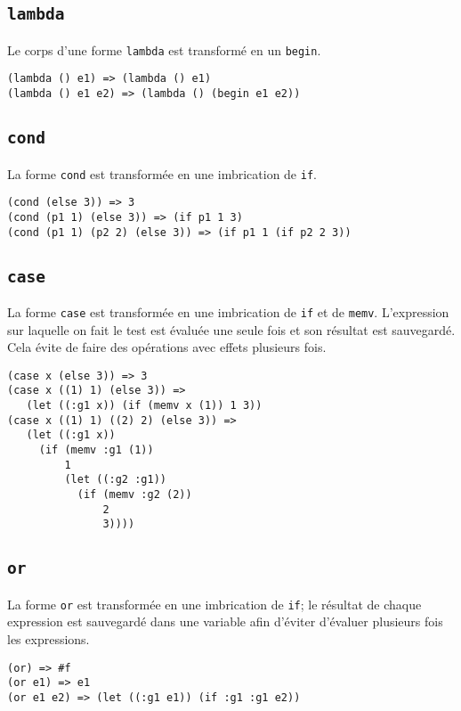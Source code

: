 \documentclass[11pt]{report}
\begin{document}
\subsection{\tt lambda}

Le corps d'une forme {\tt lambda} est transformé en un {\tt begin}.

\begin{verbatim}
(lambda () e1) => (lambda () e1)
(lambda () e1 e2) => (lambda () (begin e1 e2))
\end{verbatim}


\subsection{\tt cond}

La forme {\tt cond} est transformée en une imbrication de {\tt if}.


\begin{verbatim}
(cond (else 3)) => 3
(cond (p1 1) (else 3)) => (if p1 1 3)
(cond (p1 1) (p2 2) (else 3)) => (if p1 1 (if p2 2 3))
\end{verbatim}


\subsection{\tt case}

La forme {\tt case} est transformée en une imbrication de {\tt if} et
de {\tt memv}. L'expression sur laquelle on fait le test est évaluée
une seule fois et son résultat est sauvegardé.  Cela évite de faire
des opérations avec effets plusieurs fois.


\begin{verbatim}
(case x (else 3)) => 3
(case x ((1) 1) (else 3)) =>
   (let ((:g1 x)) (if (memv x (1)) 1 3))
(case x ((1) 1) ((2) 2) (else 3)) =>
   (let ((:g1 x))
     (if (memv :g1 (1))
         1
         (let ((:g2 :g1))
           (if (memv :g2 (2))
               2
               3))))
\end{verbatim}

\subsection{\tt or}

La forme {\tt or} est transformée en une imbrication de {\tt if}; le
résultat de chaque expression est sauvegardé dans une variable afin
d'éviter d'évaluer plusieurs fois les expressions.


\begin{verbatim}
(or) => #f
(or e1) => e1
(or e1 e2) => (let ((:g1 e1)) (if :g1 :g1 e2))
\end{verbatim}
\end{document}
